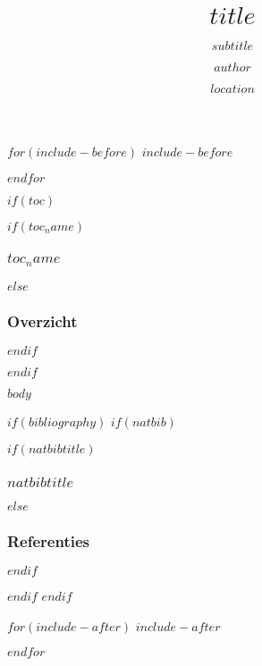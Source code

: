 \documentclass[$if(fontsize)$$fontsize$$else$10pt$endif$, $if(handout)$handout,$endif$ xetex, noamsthm]{beamer}
\title{$title$}
\subtitle{$subtitle$}
\author{$author$}
\institute{$institute$}
\date{$location$}
\date{}
\begin{document}
\begin{frame}[plain, label=intro, noframenumbering]
  \titlepage
\end{frame}

$for(include-before)$
$include-before$

$endfor$

$if(toc)$
\begin{frame}
$if(toc_name)$
  \frametitle{$toc_name$}
$else$
  \frametitle{Overzicht}
$endif$
	\tableofcontents
\end{frame}
$endif$

$body$


$if(bibliography)$
$if(natbib)$
\begin{frame}[allowframebreaks]
$if(natbibtitle)$
\frametitle{$natbibtitle$}
$else$
\frametitle{Referenties}
$endif$


\end{frame}
$endif$
$endif$

$for(include-after)$
$include-after$

$endfor$
\end{document}
